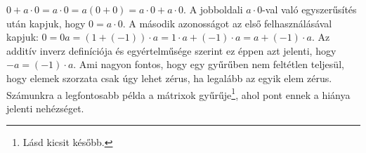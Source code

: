 \documentclass[a4paper, showtrims]{memoir}
\makeatletter
\renewenvironment{proof}[1][\proofname]
    {\par\pushQED{\qed}%
    \normalfont \topsep6\p@\@plus6\p@\relax
    \trivlist
    \item[\hskip\labelsep
        \itshape
    #1\@addpunct{:}]\ignorespaces}
    {\popQED\endtrivlist\@endpefalse}
\theoremstyle{plain}
\theoremstyle{remark}
\theoremstyle{definition}
\makeatother
\begin{document}
\begin{proof}
	\begin{math}
		0+a\cdot 0=
		a\cdot 0=
		a\left( 0+0 \right)=
		a\cdot 0+a\cdot 0.
	\end{math}
	A jobboldali $a\cdot 0$-val való egyszerűsítés után kapjuk,
	hogy $0=a\cdot 0$.
	A második azonosságot az első felhasználásával kapjuk:
	\begin{math}
		0
		=
		0a
		=
		\left( 1+\left( -1 \right) \right)\cdot a
		=
		1\cdot a + \left( -1 \right)\cdot a
		=
		a +\left( -1 \right)\cdot a.
	\end{math}
	Az additív inverz definíciója és egyértelműsége szerint ez éppen azt jelenti, hogy $-a=\left( -1 \right)\cdot a$.
\end{proof}
Ami nagyon fontos, hogy egy gyűrűben nem feltétlen teljesül,
hogy elemek szorzata csak úgy lehet zérus, ha legalább az egyik elem zérus.
Számunkra a legfontosabb példa  a mátrixok gyűrűje\footnote{Lásd kicsit később.},
ahol pont ennek a hiánya jelenti nehézséget.
\end{document}
